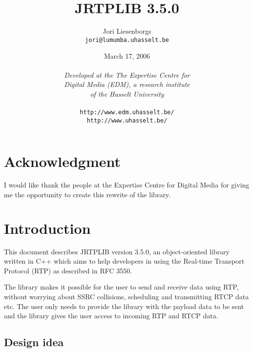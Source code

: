 \documentclass[12pt,a4paper]{article}
\newcommand{\jversion}{3.5.0}
\begin{document}
	\title{\ \vspace{3.5cm}\ \\{\bf JRTPLIB \jversion}}
	\author{Jori Liesenborgs\\{\tt jori@lumumba.uhasselt.be}}
	\date{March 17, 2006\\\vspace{0.5cm}\ \\
	      {\small{\em Developed at the The Expertise Centre for \\Digital Media (EDM),
	      a research institute\\of the Hasselt University}\\\ \\
		  {\tt http://www.edm.uhasselt.be/}\\
		  {\tt http://www.uhasselt.be/}}}
	\maketitle
	
	\newpage
	\tableofcontents

\setlength{\parindent}{0cm}
\setlength{\parskip}{0.3cm}

	\newpage
	\section*{Acknowledgment}

		I would like thank the people at the Expertise Centre for Digital Media
		for giving me the opportunity to create this rewrite of the library.

	\newpage
	\section{Introduction}

		This document describes JRTPLIB version \jversion, an object-oriented
		library written in C++ which aims to help developers in using the 
		Real-time Transport Protocol (RTP) as described in RFC 3550.

		The library makes it possible for the user to send and receive data
		using RTP, without worrying about SSRC collisions, scheduling and
		transmitting RTCP data etc. The user only needs to provide the library
		with the payload data to be sent and the library gives the user access
		to incoming RTP and RTCP data.

		\subsection{Design idea}
\end{document}
